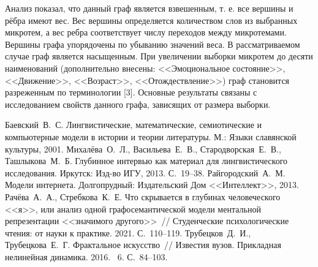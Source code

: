 Анализ показал, что данный граф является взвешенным, т. е. все вершины и рёбра имеют вес. Вес вершины определяется количеством слов из выбранных микротем, а вес ребра соответствует числу переходов между микротемами. Вершины графа упорядочены по убыванию значений веса. В рассматриваемом случае граф является насыщенным. При увеличении выборки микротем до десяти наименований (дополнительно внесены: <<Эмоциональное состояние>>, <<Движение>>, <<Возраст>>, <<Отождествление>>) граф становится разреженным по терминологии [3]. Основные результаты связаны с исследованием свойств данного графа, зависящих от размера выборки. 


\begin{thebibliography}{99}

Баевский~В.~С. Лингвистические, математические, семиотические и компьютерные модели в истории и теории литературы. М.: Языки славянской культуры, 2001.
Михалёва~О.~Л., Васильева~Е.~В., Стародворская~Е.~В., Ташлыкова~М.~Б. Глубинное интервью как материал для лингвистического исследования. Иркутск: Изд-во ИГУ, 2013. С.~19--38.
Райгородский~А.~М. Модели интернета. Долгопрудный: Издательский Дом <<Интеллект>>, 2013.
Рачёва~А.~А., Стребкова~К.~Е. Что скрывается в глубинах человеческого <<я>>, или анализ одной графосемантической модели ментальной репрезентации <<значимого другого>>~// Студенческие психологические чтения: от науки к практике. 2021. С.~110--119.
Трубецков~Д.~И., Трубецкова~Е.~Г. Фрактальное искусство~// Известия вузов. Прикладная нелинейная динамика. 2016. \textnumero~6. С.~84--103.
\end{thebibliography}






%
